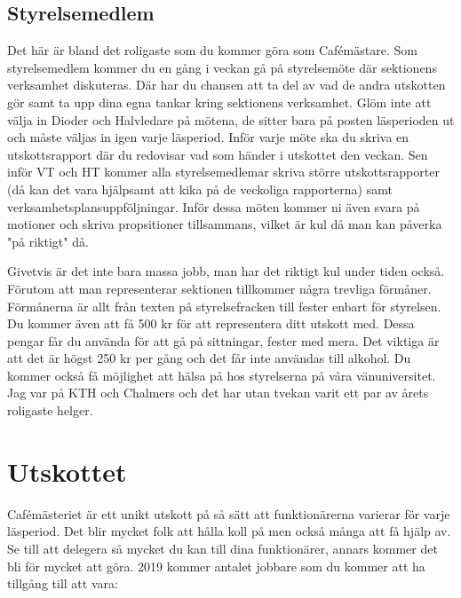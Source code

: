 \documentclass[10pt]{article}
\begin{document}
\subsection{Styrelsemedlem}
Det här är bland det roligaste som du kommer göra som Cafémästare. Som styrelsemedlem kommer du en gång i veckan gå på styrelsemöte där sektionens verksamhet diskuteras. Där har du chansen att ta del av vad de andra utskotten gör samt ta upp dina egna tankar kring sektionens verksamhet. Glöm inte att välja in Dioder och Halvledare på mötena, de sitter bara på posten läsperioden ut och måste väljas in igen varje läsperiod. Inför varje möte ska du skriva en utskottsrapport där du redovisar vad som händer i utskottet den veckan. Sen inför VT och HT kommer alla styrelsemedlemar skriva större utskottsrapporter (då kan det vara hjälpsamt att kika på de veckoliga rapporterna) samt verksamhetsplansuppföljningar. Inför dessa möten kommer ni även svara på motioner och skriva propsitioner tillsammans, vilket är kul då man kan påverka "på riktigt" då.

Givetvis är det inte bara massa jobb, man har det riktigt kul under tiden också. Förutom att man representerar sektionen tillkommer några trevliga förmåner.
Förmånerna är allt från texten på styrelsefracken till fester enbart för styrelsen. Du kommer även att få 500 kr för att representera ditt utskott med. Dessa pengar får du använda för att gå på sittningar, fester med mera. Det viktiga är att det är högst 250 kr per gång och det får inte användas till alkohol. Du kommer också få möjlighet att hälsa på hos styrelserna på våra vänuniversitet. Jag var på KTH och Chalmers och det har utan tvekan varit ett par av årets roligaste helger.

\section{Utskottet}

Cafémästeriet är ett unikt utskott på så sätt att funktionärerna varierar för varje läsperiod. Det blir mycket folk att hålla koll på men också många att få hjälp av. Se till att delegera så mycket du kan till dina funktionärer, annars kommer det bli för mycket att göra. 2019 kommer antalet jobbare som du kommer att ha tillgång till att vara:
\end{document}
